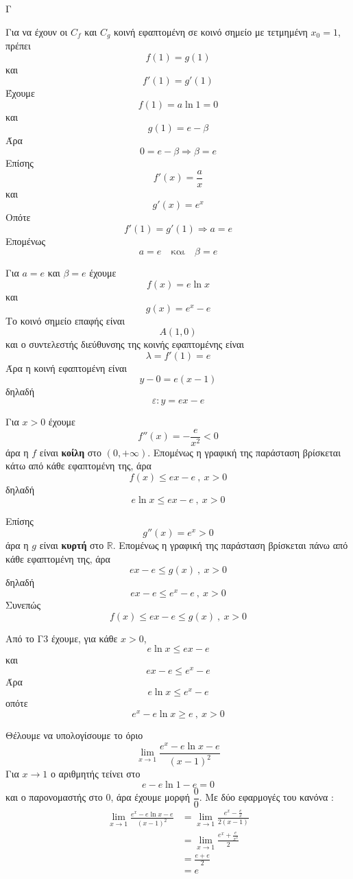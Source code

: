 \begin{thema}{Γ}
\begin{erwthma}
\item Για να έχουν οι $C_f$ και $C_g$ κοινή εφαπτομένη σε κοινό σημείο με τετμημένη $x_0=1$, πρέπει
\[f(1)=g(1)\]
και
\[f'(1)=g'(1)\]
Έχουμε
\[f(1)=a\ln 1=0\]
και
\[g(1)=e-\beta\]
Άρα
\[0=e-\beta\Rightarrow \beta=e\]
Επίσης
\[f'(x)=\frac{a}{x}\]
και
\[g'(x)=e^x\]
Οπότε
\[f'(1)=g'(1)\Rightarrow a=e\]
Επομένως
\[a=e\quad\text{και}\quad \beta=e\]

\item Για $a=e$ και $\beta=e$ έχουμε
\[f(x)=e\ln x\]
και
\[g(x)=e^x-e\]
Το κοινό σημείο επαφής είναι
\[A(1,0)\]
και ο συντελεστής διεύθυνσης της κοινής εφαπτομένης είναι
\[\lambda=f'(1)=e\]
Άρα η κοινή εφαπτομένη είναι
\[y-0=e(x-1)\]
δηλαδή
\[\varepsilon:y=ex-e\]

\item Για $x>0$ έχουμε
\[f''(x)=-\frac{e}{x^2}<0\]
άρα η $f$ είναι \textbf{κοίλη} στο $(0,+\infty)$.
Επομένως η γραφική της παράσταση βρίσκεται κάτω από κάθε εφαπτομένη της, άρα
\[f(x)\leq ex-e\ ,\ x>0\]
δηλαδή
\[e\ln x\leq ex-e\ ,\ x>0\]

Επίσης
\[g''(x)=e^x>0\]
άρα η $g$ είναι \textbf{κυρτή} στο $\mathbb{R}$.
Επομένως η γραφική της παράσταση βρίσκεται πάνω από κάθε εφαπτομένη της, άρα
\[ex-e\leq g(x)\ ,\ x>0\]
δηλαδή
\[ex-e\leq e^x-e\ ,\ x>0\]
Συνεπώς
\[f(x)\leq ex-e\leq g(x)\ ,\ x>0\]

\item Από το Γ3 έχουμε, για κάθε $x>0$,
\[e\ln x\leq ex-e\]
και
\[ex-e\leq e^x-e\]
Άρα
\[e\ln x\leq e^x-e\]
οπότε
\[e^x-e\ln x\geq e\ ,\ x>0\]

Θέλουμε να υπολογίσουμε το όριο
\[\lim\limits_{x\to 1}\frac{e^x-e\ln x-e}{(x-1)^2}\]
Για $x\to 1$ ο αριθμητής τείνει στο
\[e-e\ln1-e=0\]
και ο παρονομαστής στο $0$, άρα έχουμε μορφή $\dfrac{0}{0}$.
Με δύο εφαρμογές του κανόνα :
\begin{align*}
\lim\limits_{x\to 1}\frac{e^x-e\ln x-e}{(x-1)^2}
&=\lim\limits_{x\to 1}\frac{e^x-\frac{e}{x}}{2(x-1)}\\
&=\lim\limits_{x\to 1}\frac{e^x+\frac{e}{x^2}}{2}\\
&=\frac{e+e}{2}\\
&=e
\end{align*}
\end{erwthma}
\end{thema}

